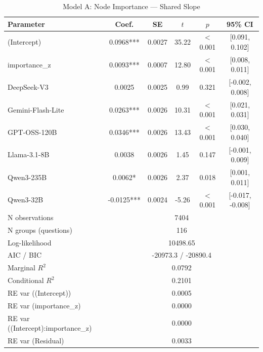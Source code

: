 \begin{table}[htbp]
\centering
\small
\caption{Model A: Node Importance --- Shared Slope}
\label{tab:lme_model_a_shared_table}
\begin{tabular}{lccccc}
\toprule
Parameter & Coef. & SE & $t$ & $p$ & 95\% CI \\
\midrule
  (Intercept) & 0.0968*** & 0.0027 & 35.22 & $<$0.001 & [0.091, 0.102] \\
  importance\_z & 0.0093*** & 0.0007 & 12.80 & $<$0.001 & [0.008, 0.011] \\
  DeepSeek-V3 & 0.0025 & 0.0025 & 0.99 & 0.321 & [-0.002, 0.008] \\
  Gemini-Flash-Lite & 0.0263*** & 0.0026 & 10.31 & $<$0.001 & [0.021, 0.031] \\
  GPT-OSS-120B & 0.0346*** & 0.0026 & 13.43 & $<$0.001 & [0.030, 0.040] \\
  Llama-3.1-8B & 0.0038 & 0.0026 & 1.45 & 0.147 & [-0.001, 0.009] \\
  Qwen3-235B & 0.0062* & 0.0026 & 2.37 & 0.018 & [0.001, 0.011] \\
  Qwen3-32B & -0.0125*** & 0.0024 & -5.26 & $<$0.001 & [-0.017, -0.008] \\
\midrule
  N observations & \multicolumn{5}{c}{7404} \\
  N groups (questions) & \multicolumn{5}{c}{116} \\
  Log-likelihood & \multicolumn{5}{c}{10498.65} \\
  AIC / BIC & \multicolumn{5}{c}{-20973.3 / -20890.4} \\
  Marginal $R^2$ & \multicolumn{5}{c}{0.0792} \\
  Conditional $R^2$ & \multicolumn{5}{c}{0.2101} \\
  RE var ((Intercept)) & \multicolumn{5}{c}{0.0005} \\
  RE var (importance\_z) & \multicolumn{5}{c}{0.0000} \\
  RE var ((Intercept):importance\_z) & \multicolumn{5}{c}{0.0000} \\
  RE var (Residual) & \multicolumn{5}{c}{0.0033} \\
\bottomrule
\end{tabular}
\end{table}
